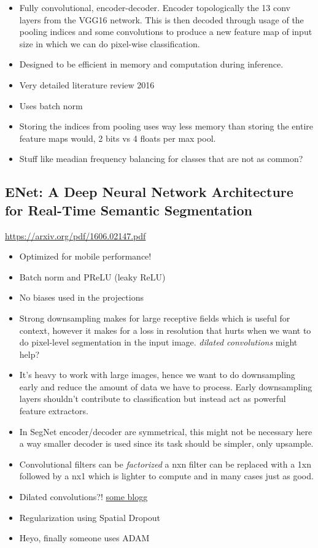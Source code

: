 \documentclass[11pt]{article}
\begin{document}
\begin{itemize}
\item Fully convolutional, encoder-decoder. Encoder topologically the 13 conv layers from the VGG16 network. This is then decoded through usage of the pooling indices and some convolutions to produce a new feature map of input size in which we can do pixel-wise classification.
\item Designed to be efficient in memory and computation during inference.
\item Very detailed literature review 2016
\item Uses batch norm
\item Storing the indices from pooling uses way less memory than storing the entire feature maps would, 2 bits vs 4 floats per max pool.
\item Stuff like meadian frequency balancing for classes that are not as common?
\end{itemize}

\subsection{ENet: A Deep Neural Network Architecture for Real-Time Semantic Segmentation}
\label{sec:org19d3d9e}
\url{https://arxiv.org/pdf/1606.02147.pdf}

\begin{itemize}
\item Optimized for mobile performance!
\item Batch norm and PReLU (leaky ReLU)
\item No biases used in the projections
\item Strong downsampling makes for large receptive fields which is useful for context, however it makes for a loss in resolution that hurts when we want to do pixel-level segmentation in the input image. \emph{dilated convolutions} might help?
\item It's heavy to work with large images, hence we want to do downsampling early and reduce the amount of data we have to process. Early downsampling layers shouldn't contribute to classification but instead act as powerful feature extractors.
\item In SegNet encoder/decoder are symmetrical, this might not be necessary here a way smaller decoder is used since its task should be simpler, only upsample.
\item Convolutional filters can be \emph{factorized} a nxn filter can be replaced with a 1xn followed by a nx1 which is lighter to compute and in many cases just as good.
\item Dilated convolutions?! \href{http://www.inference.vc/dilated-convolutions-and-kronecker-factorisation/}{some blogg}
\item Regularization using Spatial Dropout
\item Heyo, finally someone uses ADAM
\end{itemize}
\end{document}
